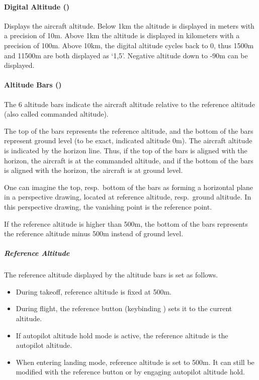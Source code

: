 \paragraph{Digital Altitude ()}
Displays the aircraft altitude.
Below 1km the altitude is displayed in meters with a precision of 10m.
Above 1km the altitude is displayed in kilometers with a precision of 100m.
Above 10km, the digital altitude cycles back to 0,
thus 1500m and 11500m are both displayed as `1,5'.
Negative altitude down to -90m can be displayed.

\paragraph{Altitude Bars ()}
The 6 altitude bars indicate the aircraft altitude relative to the reference altitude
(also called commanded altitude).

The top of the bars represents the reference altitude,
and the bottom of the bars represent ground level (to be exact, indicated altitude 0m).
The aircraft altitude is indicated by the horizon line.
Thus, if the top of the bars is aligned with the horizon, the aircraft is at the commanded altitude,
and if the bottom of the bars is aligned with the horizon, the aircraft is at ground level.

One can imagine the top, resp.\ bottom of the bars as forming a horizontal
plane in a perspective drawing, located at reference altitude, resp.\ ground altitude.
In this perspective drawing, the vanishing point is the reference point.

If the reference altitude is higher than 500m,
the bottom of the bars represents the reference altitude minus 500m instead of ground level.

\subparagraph{Reference Altitude}
\label{sec:ref-alt}
The reference altitude displayed by the altitude bars is set as follows.
\begin{itemize}[noitemsep]
  \item During takeoff, reference altitude is fixed at 500m.
  \item During flight, the reference button (keybinding ) 
    sets it to the current altitude.
  \item If autopilot altitude hold mode is active,
    the reference altitude is the autopilot altitude.
  \item When entering landing mode, reference altitude is set to 500m.
    It can still be modified with the reference button or by engaging autopilot altitude hold.
\end{itemize}

